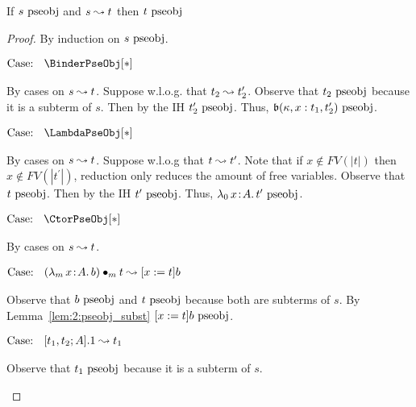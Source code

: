 \begin{lemma}
    If $s~\mbox{\normalfont pseobj}$ and $s \leadsto t$ then $t~\mbox{\normalfont pseobj}$
    \label{lem:2:pseobj_preservation_step}
\end{lemma}
\begin{proof}
    By induction on $s~\mbox{\normalfont pseobj}$.

    $\text{Case: }\begin{array}{c} \BinderPseObj[*] \end{array}$
    \begin{proofcase}
        By cases on $s \leadsto t$. Suppose w.l.o.g. that $t_2 \leadsto t_2^\prime$.
        Observe that $t_2~\mbox{\normalfont pseobj}$ because it is a subterm of $s$.
        Then by the IH $t_2^\prime~\mbox{\normalfont pseobj}$.
        Thus, $\mathfrak{b}(\kappa, x : t_1, t_2^\prime) ~\mbox{\normalfont pseobj}$.
    \end{proofcase}

    $\text{Case: }\begin{array}{c} \LambdaPseObj[*] \end{array}$
    \begin{proofcase}
        By cases on $s \leadsto t$. Suppose w.l.o.g that $t \leadsto t^\prime$.
        Note that if $x \notin FV(|t|)$ then $x \notin FV(|t^\prime|)$, reduction only reduces the amount of free variables.
        Observe that $t ~\mbox{\normalfont pseobj}$.
        Then by the IH $t^\prime~\mbox{\normalfont pseobj}$.
        Thus, ${\lambda_0}\, x\! : \! A.\, t^\prime~\mbox{\normalfont pseobj}$.
    \end{proofcase}

    $\text{Case: }\begin{array}{c} \CtorPseObj[*] \end{array}$
    \begin{proofcase}
        By cases on $s \leadsto t$.

        $\text{Case: }\begin{array}{c} ({\lambda_m}\, x\! : \! A.\, b) \bullet_{m} t \leadsto [x := t]b \end{array}$
        \begin{proofcase}
            Observe that $b~\mbox{\normalfont pseobj}$ and $t~\mbox{\normalfont pseobj}$ because both are subterms of $s$.
            By Lemma~\ref{lem:2:pseobj_subst} $[x := t]b~\mbox{\normalfont pseobj}$.
        \end{proofcase}

        $\text{Case: }\begin{array}{c} [t_1, t_2; A].1 \leadsto t_1 \end{array}$
        \begin{proofcase}
            Observe that $t_1~\mbox{\normalfont pseobj}$ because it is a subterm of $s$.
        \end{proofcase}


\end{proofcase}
\end{proof}
